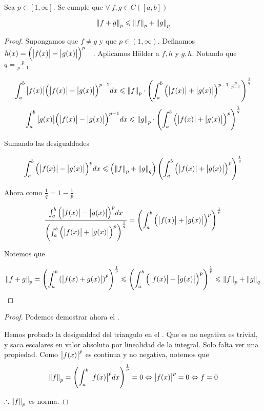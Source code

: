 \begin{lemma}\label{lema221}
    Sea $p\in [1,\infty]$. Se cumple que $\forall \: f,g \in C([a,b])$

    $$\norm{f+g}_p \leqslant \norm{f}_p + \norm{g}_p$$
\end{lemma}

\begin{proof}
    Supongamos que $f \neq g$ y que $p \in (1,\infty)$. Definamos $h(x) = {\left(\abs{f(x)}-\abs{g(x)}\right)}^{p-1}$. Aplicamos Hölder a $f,h$ y $g,h$. Notando que $q=\frac{p}{p-1}$

    $$ \int_{a}^{b} \abs{f(x)} {\left(\abs{f(x)}-\abs{g(x)}\right)}^{p-1}dx \leqslant \norm{f}_p \cdot {\left(\int_{a}^{b} {\left(\abs{f(x)}+\abs{g(x)}\right)}^{p-1\cdot\frac{p}{p-1}} \right)}^{\frac{1}{q}} $$
    $$ \int_{a}^{b} \abs{g(x)} {\left(\abs{f(x)}-\abs{g(x)}\right)}^{p-1}dx \leqslant \norm{g}_p \cdot {\left(\int_{a}^{b} {\left(\abs{f(x)}+\abs{g(x)}\right)}^{p} \right)}^{\frac{1}{q}} $$

    Sumando las desigualdades

    $$\int_{a}^{b} {\left(\abs{f(x)}-\abs{g(x)}\right)}^{p}dx \leqslant \left(\norm{f}_p+\norm{g}_q\right) {\left(\int_{a}^{b} {\left(\abs{f(x)}+\abs{g(x)}\right)}^{p} \right)}^{\frac{1}{q}} $$

    Ahora como $\frac{1}{q} = 1-\frac{1}{p}$ 

    $$\frac{\int_{a}^{b} {\left(\abs{f(x)}-\abs{g(x)}\right)}^{p}dx}{{\left(\int_{a}^{b} {\left(\abs{f(x)}+\abs{g(x)}\right)}^{p} \right)}^{\frac{1}{q}}} = {\left(\int_{a}^{b} {\left(\abs{f(x)}+\abs{g(x)}\right)}^{p} \right)}^{\frac{1}{p}}$$

    Notemos que

    $$\norm{f+g}_p = {\left(\int_{a}^{b} {(\abs{f(x)+g(x)})}^{p} \right)}^{\frac{1}{p}} \leqslant {\left(\int_{a}^{b} {\left(\abs{f(x)}+\abs{g(x)}\right)}^{p} \right)}^{\frac{1}{p}} \leqslant \norm{f}_p+\norm{g}_q$$
\end{proof}

\begin{proof}
    Podemos demostrar ahora el . 
    
    Hemos probado la desigualdad del triangulo en el . Que es no negativa es trivial, y saca escalares en valor absoluto por linealidad de la integral. Solo falta ver una propiedad. Como $\abs{f(x)}^p$ es continua y no negativa, notemos que
     $$ \norm{f}_p = {\left( \int_{a}^{b} {\abs{f(x)}}^{p} dx \right)}^{\frac{1}{p}} = 0 \Leftrightarrow  {\abs{f(x)}}^{p} = 0 \Leftrightarrow f = 0$$

     $\therefore \norm{f}_p$ es norma.
\end{proof}

